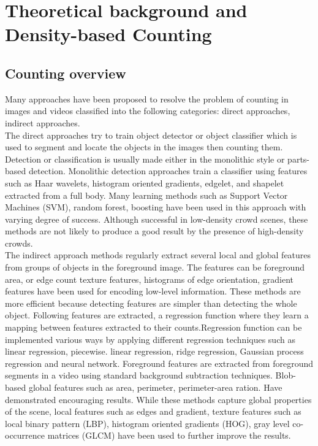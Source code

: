 \chapter{Theoretical background and Density-based Counting}
\section{Counting overview}
Many approaches have been proposed to resolve the problem of counting in images and videos classified into the following categories: direct approaches, indirect approaches. \\
The direct approaches try to train object detector or object classifier which is used to segment and locate the objects in the images then counting them. Detection or classification is usually made either in the monolithic style or parts-based detection. Monolithic detection approaches train a classifier using features such as Haar wavelets, histogram oriented gradients, edgelet, and shapelet extracted from a full body. Many learning methods such as Support Vector Machines (SVM), random forest, boosting have been used in this approach with varying degree of success. Although successful in low-density crowd scenes, these methods are not likely to produce a good result by the presence of high-density crowds.\\
The indirect approach methods regularly extract several local and global features from groups of objects in the foreground image. The features can be foreground area, or edge count texture features, histograms of edge orientation,  gradient features have been used for encoding low-level information. These methods are more efficient because detecting features are simpler than detecting the whole object. Following features are extracted, a regression function where they learn a mapping between features extracted to their counts.Regression function can be implemented various ways by applying different regression techniques such as linear regression, piecewise.
linear regression, ridge regression, Gaussian process regression and neural network. Foreground features are extracted from foreground segments in a video using standard background subtraction techniques. Blob-based global features such as area, perimeter, perimeter-area ration. Have demonstrated encouraging results. While these methods capture global properties of the scene, local features such as edges and gradient, texture features such as local binary pattern (LBP), histogram oriented gradients (HOG), gray level co-occurrence matrices (GLCM) have been used to further improve the results.
